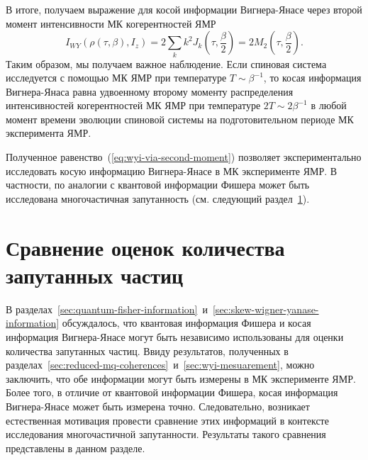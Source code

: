 %
В итоге, получаем выражение для косой информации Вигнера-Янасе
через второй момент интенсивности МК когерентностей ЯМР
%
\begin{equation}\label{eq:wyi-via-second-moment}
    I_{WY}\left(\rho(\tau, \beta), I_z\right)
    = 2\sum_k k^2 J_k\left(\tau, \frac{\beta}{2}\right)
    = 2M_2\left(\tau, \frac{\beta}{2}\right).
\end{equation}
%
Таким образом, мы получаем важное наблюдение.
Если спиновая система исследуется с помощью МК ЯМР при температуре $T\sim\beta^{-1}$,
то косая информация Вигнера-Янаса равна удвоенному второму моменту
распределения интенсивностей когерентностей МК ЯМР при температуре $2T \sim 2\beta^{-1}$
в любой момент времени эволюции спиновой системы на подготовительном периоде МК эксперимента ЯМР.

Полученное равенство~(\ref{eq:wyi-via-second-moment}) позволяет экспериментально исследовать
косую информацию Вигнера-Янасе в МК эксперименте ЯМР.
В частности, по аналогии с квантовой информации Фишера
может быть исследована многочастичная запутанность (см. следующий раздел~\ref{sec:qfi-wyi-entanglement-comparison}).


\section{Сравнение оценок количества запутанных частиц}
\label{sec:qfi-wyi-entanglement-comparison}

В разделах~\ref{sec:quantum-fisher-information}~и~\ref{sec:skew-wigner-yanase-information} обсуждалось,
что квантовая информация Фишера и косая информация Вигнера-Янасе
могут быть независимо использованы для оценки количества запутанных частиц.
Ввиду результатов, полученных в разделах~\ref{sec:reduced-mq-coherences}~и~\ref{sec:wyi-mesuarement},
можно заключить,
что обе информации могут быть измерены в МК эксперименте ЯМР.
Более того, в отличие от квантовой информации Фишера,
косая информация Вигнера-Янасе может быть измерена точно.
Следовательно, возникает естественная мотивация провести сравнение
этих информаций в контексте исследования многочастичной запутанности.
Результаты такого сравнения представлены в данном разделе.

